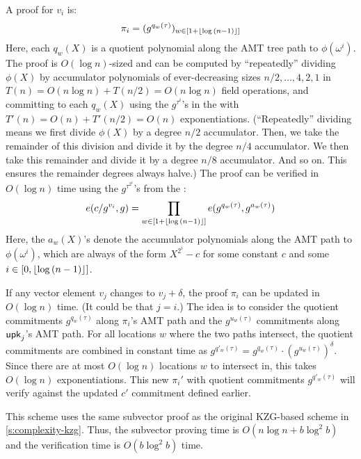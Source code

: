A proof for $v_i$ is:
\begin{align}
\pi_i = (g^{q_w(\tau)})_{w\in \left[1+\lfloor\log{(n-1)}\rfloor\right]}
\end{align}
Here, each $q_w(X)$ is a quotient polynomial along the AMT tree path to $\phi(\omega^i)$.
The proof is $O(\log{n})$-sized and can be computed by ``repeatedly'' dividing $\phi(X)$ by accumulator polynomials of ever-decreasing sizes $n/2, \dots, 4,2,1$ in $T(n)=O(n\log{n}) + T(n/2) = O(n\log{n})$ field operations, and committing to each $q_w(X)$ using the $g^{\tau^i}$'s in the \prk with $T'(n) = O(n) + T'(n/2)=O(n)$ exponentiations.
(``Repeatedly'' dividing means we first divide $\phi(X)$ by a degree $n/2$ accumulator. Then, we take the remainder of this division and divide it by the degree $n/4$ accumulator. We then take this remainder and divide it by a degree $n/8$ accumulator. And so on. This ensures the remainder degrees always halve.)
The proof can be verified in $O(\log{n})$ time using the $g^{\tau^{2^i}}$'s from the \vrk:
\begin{align}
e(c/g^{v_i}, g) = \prod_{w\in \left[1+\lfloor\log{(n-1)}\rfloor\right]}e(g^{q_w(\tau)}, g^{a_w(\tau)})
\end{align}
Here, the $a_w(X)$'s denote the accumulator polynomials along the AMT path to $\phi(\omega^i)$, which are always of the form $X^{2^i} - c$ for some constant $c$ and some $i\in [0,\lfloor\log{(n-1)}\rfloor]$.

If any vector element $v_j$ changes to $v_j + \delta$, the proof $\pi_i$ can be updated in $O(\log{n})$ time.
(It could be that $j=i$.)
The idea is to consider the quotient commitments $g^{q_{w}(\tau)}$ along $\pi_i$'s AMT path and the $g^{u_w(\tau)}$ commitments along $\mathsf{upk}_j$'s AMT path.
For all locations $w$ where the two paths intersect, the quotient commitments are combined in constant time as $g^{q'_w(\tau)} = g^{q_w(\tau)} \cdot \left(g^{u_w(\tau)}\right)^\delta.$
Since there are at most $O(\log{n})$ locations $w$ to intersect in, this takes $O(\log{n})$ exponentiations.
This new $\pi_i'$ with quotient commitments $g^{q'_w(\tau)}$ will verify against the updated $c'$ commitment defined earlier.

This scheme uses the same subvector proof as the original KZG-based scheme in \cref{s:complexity-kzg}.
Thus, the subvector proving time is $O(n\log{n}+b\log^2{b})$ and the verification time is $O(b\log^2{b})$ time.

